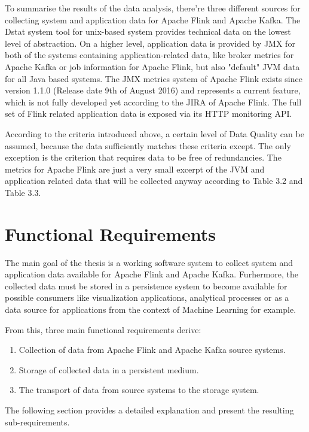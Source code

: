 To summarise the results of the data analysis, there're three different sources for collecting system and application
data for Apache Flink and Apache Kafka. The Dstat system tool for unix-based system provides technical data on the
lowest level of abstraction. On a higher level, application data is provided by JMX for both of the systems containing
application-related data, like broker metrics for Apache Kafka or job information for Apache Flink, but also "default"
JVM data for all Java based systems. The JMX metrics system of Apache Flink exists since version 1.1.0 (Release date
9th of August 2016) and represents a current feature, which is not fully developed yet according to the JIRA of
Apache Flink. The full set of Flink related application data is exposed via its HTTP
monitoring API.

According to the criteria introduced above, a certain level of Data Quality can be assumed, because the data sufficiently
matches these criteria except. The only exception is the criterion that requires data to be free of redundancies. The metrics
for Apache Flink are just a very small excerpt of the JVM and application related data that will be collected anyway according
to Table 3.2 and Table 3.3.

\section{Functional Requirements}

The main goal of the thesis is a working software system to collect system and application data available
for Apache Flink and Apache Kafka. Furhermore, the collected data must be stored in a
persistence system to become available for possible consumers like visualization applications,
analytical processes or as a data source for applications from the context of Machine Learning
for example.

From this, three main functional requirements derive:
\begin{enumerate}
    \item Collection of data from Apache Flink and Apache Kafka source systems.
    \item Storage of collected data in a persistent medium.
    \item The transport of data from source systems to the storage system.
\end{enumerate}

The following section provides a detailed explanation and present the resulting sub-requirements.

